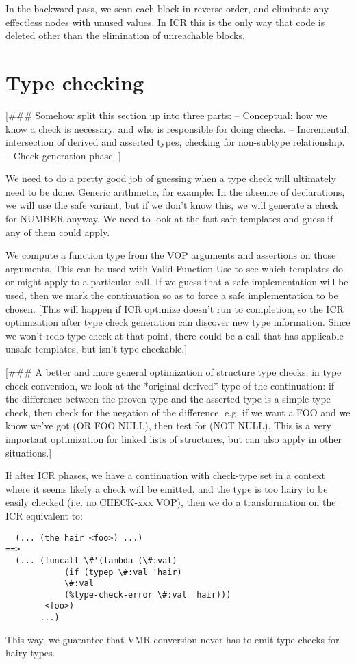 In the backward pass, we scan each block in reverse order, and
eliminate any effectless nodes with unused values.  In ICR this is the
only way that code is deleted other than the elimination of unreachable blocks.


\chapter{Type checking}

[\#\#\# Somehow split this section up into three parts:
 -- Conceptual: how we know a check is necessary, and who is responsible for
    doing checks.
 -- Incremental: intersection of derived and asserted types, checking for
    non-subtype relationship.
 -- Check generation phase.
]


We need to do a pretty good job of guessing when a type check will ultimately
need to be done.  Generic arithmetic, for example: In the absence of
declarations, we will use the safe variant, but if we don't know this, we
will generate a check for NUMBER anyway.  We need to look at the fast-safe
templates and guess if any of them could apply.

We compute a function type from the VOP arguments
and assertions on those arguments.  This can be used with Valid-Function-Use
to see which templates do or might apply to a particular call.  If we guess
that a safe implementation will be used, then we mark the continuation so as to
force a safe implementation to be chosen.  [This will happen if ICR optimize
doesn't run to completion, so the ICR optimization after type check generation
can discover new type information.  Since we won't redo type check at that
point, there could be a call that has applicable unsafe templates, but isn't
type checkable.]

[\#\#\# A better and more general optimization of structure type checks: in type
check conversion, we look at the *original derived* type of the continuation:
if the difference between the proven type and the asserted type is a simple
type check, then check for the negation of the difference.  e.g. if we want a
FOO and we know we've got (OR FOO NULL), then test for (NOT NULL).  This is a
very important optimization for linked lists of structures, but can also apply
in other situations.]

If after ICR phases, we have a continuation with check-type set in a context
where it seems likely a check will be emitted, and the type is too 
hairy to be easily checked (i.e. no CHECK-xxx VOP), then we do a transformation
on the ICR equivalent to:
\begin{verbatim}
  (... (the hair <foo>) ...)
==>
  (... (funcall \#'(lambda (\#:val)
		    (if (typep \#:val 'hair)
			\#:val
			(%type-check-error \#:val 'hair)))
		<foo>)
       ...)
\end{verbatim}
This way, we guarantee that VMR conversion never has to emit type checks for
hairy types.

